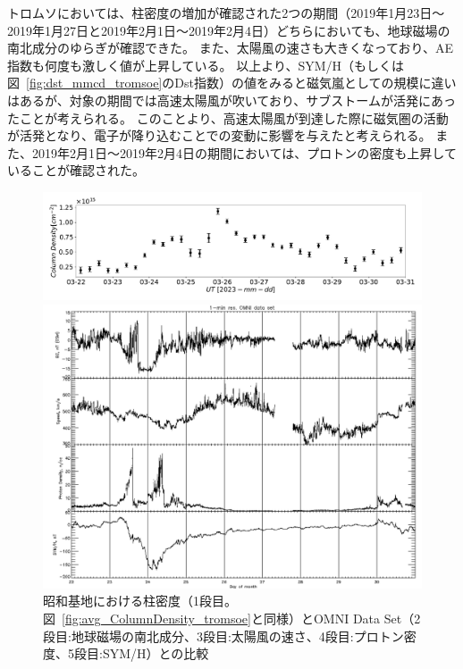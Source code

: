 トロムソにおいては、柱密度の増加が確認された2つの期間（2019年1月23日〜2019年1月27日と2019年2月1日〜2019年2月4日）どちらにおいても、地球磁場の南北成分のゆらぎが確認できた。
また、太陽風の速さも大きくなっており、AE指数も何度も激しく値が上昇している。
以上より、SYM/H（もしくは図~\ref{fig:dst_mmcd_tromsoe}のDst指数）の値をみると磁気嵐としての規模に違いはあるが、対象の期間では高速太陽風が吹いており、サブストームが活発にあったことが考えられる。
このことより、高速太陽風が到達した際に磁気圏の活動が活発となり、電子が降り込むことでの変動に影響を与えたと考えられる。
また、2019年2月1日〜2019年2月4日の期間においては、プロトンの密度も上昇していることが確認された。\par
\begin{figure}[htbp]
    \centering
    \begin{minipage}{\linewidth}
        \centering
        \includegraphics[width=\linewidth]{master_thesis_contents/master_thesis_fig/column_density_spectr6_syowa.pdf}
    \end{minipage}
    \begin{minipage}{0.96\linewidth}
        \centering
        \includegraphics[width=\linewidth]{master_thesis_contents/master_thesis_fig/omni_syowa.pdf}
    \end{minipage}
    \caption{昭和基地における柱密度（1段目。図~\ref{fig:avg_ColumnDensity_tromsoe}と同様）とOMNI Data Set（2段目:地球磁場の南北成分、3段目:太陽風の速さ、4段目:プロトン密度、5段目:SYM/H）との比較}
    \label{fig:omni_mmcd_syowa}
\end{figure}

